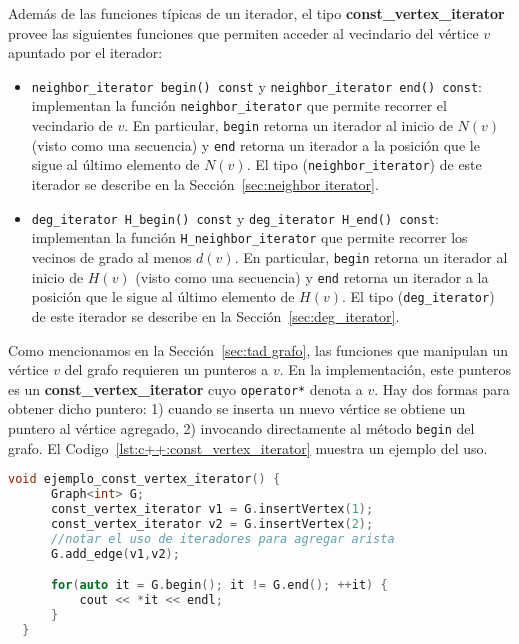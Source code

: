 \documentclass[%
    a4paper,%
    12pt,%
    twoside,%
    openright,%
    halfparskip,%
    cleardoubleempty,%
    bigheadings,%
    titlepage,%
    headsepline%
]{scrbook}
\makeatletter
\newcommand{\Code}[1]{\lstinline[basicstyle={\tt}]@#1@}
\makeatother
\begin{document}
Además de las funciones típicas de un iterador, el tipo \textbf{const\_vertex\_iterator} provee las siguientes funciones que permiten acceder al vecindario del vértice $v$ apuntado por el iterador:
\begin{itemize}
 \item \Code{neighbor_iterator begin() const} y \Code{neighbor_iterator end() const}: implementan la función \Code{neighbor_iterator} que permite recorrer el vecindario de $v$.  En particular, \Code{begin} retorna un iterador al inicio de $N(v)$ (visto como una secuencia) y \Code{end} retorna un iterador a la posición que le sigue al último elemento de $N(v)$.  El tipo (\Code{neighbor_iterator}) de este iterador se describe en la Sección~\ref{sec:neighbor iterator}. 
 \item \Code{deg_iterator H_begin() const} y \Code{deg_iterator H_end() const}: implementan la función \Code{H_neighbor_iterator} que permite recorrer los vecinos de grado al menos $d(v)$.  En particular, \Code{begin} retorna un iterador al inicio de $H(v)$ (visto como una secuencia) y \Code{end} retorna un iterador a la posición que le sigue al último elemento de $H(v)$.  El tipo (\Code{deg_iterator}) de este iterador se describe en la Sección~\ref{sec:deg_iterator}. 
\end{itemize}

Como mencionamos en la Sección~\ref{sec:tad grafo}, las funciones que manipulan un vértice $v$ del grafo requieren un punteros a $v$.  En la implementación, este punteros es un \textbf{const\_vertex\_iterator} cuyo \Code{operator*} denota a $v$.  Hay dos formas para obtener dicho puntero: 1) cuando se inserta un nuevo vértice se obtiene un puntero al vértice agregado, 2) invocando directamente al método \Code{begin} del grafo.  El Codigo~\ref{lst:c++:const_vertex_iterator} muestra un ejemplo del uso.

\def\lstlistingname{Código}


\begin{lstlisting}[caption={Ejemplo de uso de \Code{const_vertex_iterator} para manipular el grafo.  En el ejemplo, se crean dos vértices unidos por una arista y se imprime dicha arista.},name=const_vertex_iterator,gobble=2,float=ht,label={lst:c++:const_vertex_iterator},language=C++]
  void ejemplo_const_vertex_iterator() {
      Graph<int> G;
      const_vertex_iterator v1 = G.insertVertex(1);
      const_vertex_iterator v2 = G.insertVertex(2);
      //notar el uso de iteradores para agregar arista
      G.add_edge(v1,v2);

      for(auto it = G.begin(); it != G.end(); ++it) {
          cout << *it << endl;
      }
  }
\end{lstlisting}
\end{document}
